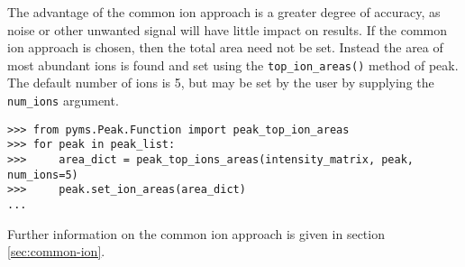 The advantage of the common ion approach is a greater degree of
accuracy, as noise or other unwanted signal will have little impact on
results. If the common ion approach is chosen, then the total area
need not be set. Instead the area of most abundant ions is found and
set using the {\tt top\_ion\_areas()} method of peak. The default number of
ions is 5, but may be set by the user by supplying the {\tt num\_ions}
argument.

\begin{verbatim}
>>> from pyms.Peak.Function import peak_top_ion_areas
>>> for peak in peak_list:
>>>     area_dict = peak_top_ions_areas(intensity_matrix, peak, num_ions=5)
>>>     peak.set_ion_areas(area_dict)
...
\end{verbatim}


Further information on the common ion approach is given in section \ref{sec:common-ion}.

